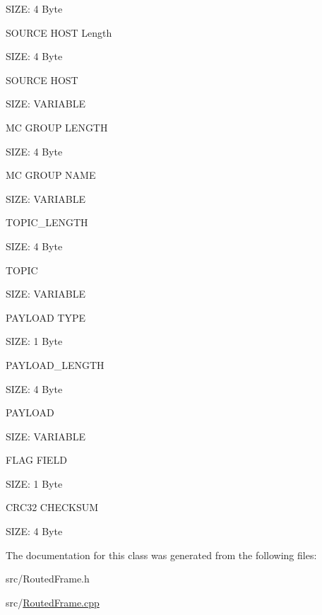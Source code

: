 \begin{DoxyItemize}
\begin{DoxyItemize}
\item S\-I\-Z\-E\-: 4 Byte
\end{DoxyItemize}
\item S\-O\-U\-R\-C\-E H\-O\-S\-T Length
\begin{DoxyItemize}
\item S\-I\-Z\-E\-: 4 Byte
\end{DoxyItemize}
\item S\-O\-U\-R\-C\-E H\-O\-S\-T
\begin{DoxyItemize}
\item S\-I\-Z\-E\-: V\-A\-R\-I\-A\-B\-L\-E
\end{DoxyItemize}
\item M\-C G\-R\-O\-U\-P L\-E\-N\-G\-T\-H
\begin{DoxyItemize}
\item S\-I\-Z\-E\-: 4 Byte
\end{DoxyItemize}
\item M\-C G\-R\-O\-U\-P N\-A\-M\-E
\begin{DoxyItemize}
\item S\-I\-Z\-E\-: V\-A\-R\-I\-A\-B\-L\-E
\end{DoxyItemize}
\item T\-O\-P\-I\-C\-\_\-\-L\-E\-N\-G\-T\-H
\begin{DoxyItemize}
\item S\-I\-Z\-E\-: 4 Byte
\end{DoxyItemize}
\item T\-O\-P\-I\-C
\begin{DoxyItemize}
\item S\-I\-Z\-E\-: V\-A\-R\-I\-A\-B\-L\-E
\end{DoxyItemize}
\item P\-A\-Y\-L\-O\-A\-D T\-Y\-P\-E
\begin{DoxyItemize}
\item S\-I\-Z\-E\-: 1 Byte
\end{DoxyItemize}
\item P\-A\-Y\-L\-O\-A\-D\-\_\-\-L\-E\-N\-G\-T\-H
\begin{DoxyItemize}
\item S\-I\-Z\-E\-: 4 Byte
\end{DoxyItemize}
\item P\-A\-Y\-L\-O\-A\-D
\begin{DoxyItemize}
\item S\-I\-Z\-E\-: V\-A\-R\-I\-A\-B\-L\-E
\end{DoxyItemize}
\item F\-L\-A\-G F\-I\-E\-L\-D
\begin{DoxyItemize}
\item S\-I\-Z\-E\-: 1 Byte
\end{DoxyItemize}
\item C\-R\-C32 C\-H\-E\-C\-K\-S\-U\-M
\begin{DoxyItemize}
\item S\-I\-Z\-E\-: 4 Byte 
\end{DoxyItemize}
\end{DoxyItemize}

The documentation for this class was generated from the following files\-:\begin{DoxyCompactItemize}
\item 
src/Routed\-Frame.\-h\item 
src/\hyperlink{RoutedFrame_8cpp}{Routed\-Frame.\-cpp}\end{DoxyCompactItemize}
